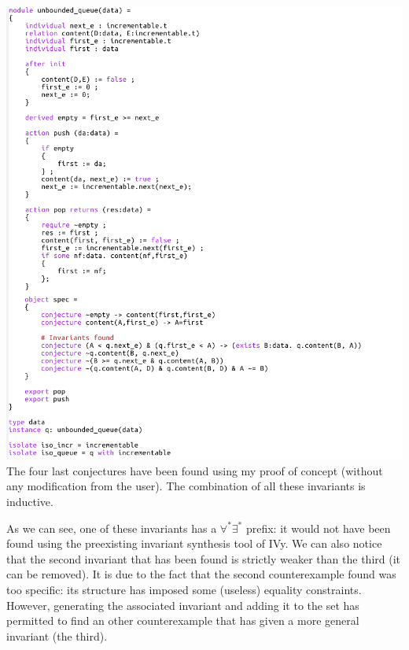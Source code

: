 \documentclass[11pt,a4paper,oldfontcommands,openany]{memoir}
\begin{document}
    \includegraphics[width=17cm]{Queue2}\\

    The four last conjectures have been found using my proof of concept (without any modification from the user).
    The combination of all these invariants is inductive.

    As we can see, one of these invariants has a \(\forall^*\exists^*\) prefix: it would not have been found using the preexisting invariant synthesis tool of IVy.
    We can also notice that the second invariant that has been found is strictly weaker than the third (it can be removed).
    It is due to the fact that the second counterexample found was too specific: its structure has imposed some (useless) equality constraints.
    However, generating the associated invariant and adding it to the set has permitted to find an other counterexample that has given a more general invariant (the third).
\end{document}
